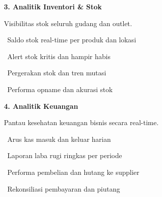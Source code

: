 \documentclass[a4paper]{article}
\begin{document}
\vspace{8pt}

\noindent
\begin{minipage}[t]{0.485\textwidth}
    \colorbox{EmeraldPrimary}{%
        \begin{minipage}{\dimexpr\textwidth-14pt}
            \vspace{5pt}
            {\fontsize{10}{13}\selectfont\bfseries\color{White} 3. Analitik Inventori \& Stok}
            \vspace{5pt}
        \end{minipage}}
    \vspace{5pt}
    {\fontsize{9}{12}\selectfont\color{TextDark}%
    Visibilitas stok seluruh gudang dan outlet.\par\vspace{3pt}
    \textbullet\ Saldo stok real-time per produk dan lokasi\par\vspace{2pt}%
    \textbullet\ Alert stok kritis dan hampir habis\par\vspace{2pt}%
    \textbullet\ Pergerakan stok dan tren mutasi\par\vspace{2pt}%
    \textbullet\ Performa opname dan akurasi stok}%
\end{minipage}%
\hfill
\begin{minipage}[t]{0.485\textwidth}
    \colorbox{PurplePrimary}{%
        \begin{minipage}{\dimexpr\textwidth-14pt}
            \vspace{5pt}
            {\fontsize{10}{13}\selectfont\bfseries\color{White} 4. Analitik Keuangan}
            \vspace{5pt}
        \end{minipage}}
    \vspace{5pt}
    {\fontsize{9}{12}\selectfont\color{TextDark}%
    Pantau kesehatan keuangan bisnis secara real-time.\par\vspace{3pt}
    \textbullet\ Arus kas masuk dan keluar harian\par\vspace{2pt}%
    \textbullet\ Laporan laba rugi ringkas per periode\par\vspace{2pt}%
    \textbullet\ Performa pembelian dan hutang ke supplier\par\vspace{2pt}%
    \textbullet\ Rekonsiliasi pembayaran dan piutang}%
\end{minipage}
\end{document}
